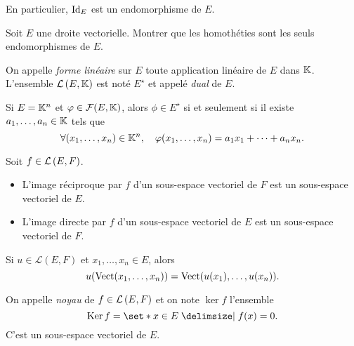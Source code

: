 \documentclass{magnoliaold}
\begin{document}
\begin{remarqueUnique}
\remarque En particulier, $\operatorname{Id}_E$ est un endomorphisme de $E$.
\end{remarqueUnique}

\begin{exoUnique}
\exo Soit $E$ une droite vectorielle. Montrer que les homothéties sont les seuls
  endomorphismes de $E$.
\end{exoUnique}

\begin{definition}[utile=1]
On appelle \emph{forme linéaire} sur $E$ toute application linéaire de $E$ dans $\mathbb{K}$.
L'ensemble $\mathcal{L}\left(E,\mathbb{K}\right)$ est noté $E^\star$ et appelé \emph{dual} de $E$.
\end{definition}

\begin{remarqueUnique}
\remarque Si $E=\mathbb{K}^n$ et $\varphi\in\mathcal{F}(E,\mathbb{K})$, alors $\phi\in E^\star$
  si et seulement si il existe $a_1,\ldots,a_n\in\mathbb{K}$ tels que
  \[\forall (x_1,\ldots,x_n)\in\mathbb{K}^n,\quad \varphi(x_1,\ldots,x_n)=a_1x_1+\cdots+a_nx_n.\]
\end{remarqueUnique}

\begin{proposition}[utile=-3]
Soit $f\in\mathcal{L}\left(E,F\right)$.
\begin{itemize}
\item L'image réciproque par $f$ d'un sous-espace vectoriel de $F$ est un
  sous-espace vectoriel de $E$.
\item L'image directe par $f$ d'un sous-espace vectoriel de $E$ est un
  sous-espace vectoriel de $F$.
\end{itemize}
\end{proposition}

\begin{remarqueUnique}
\remarque Si $u\in\mathcal{L}(E, F)$ et $x_1,\ldots,x_n\in E$, alors
  \[u(\operatorname{Vect}(x_1,\ldots,x_n))=\operatorname{Vect}(u(x_1),\ldots,u(x_n)).\]
\end{remarqueUnique}

\begin{definition}[utile=-3]
On appelle \emph{noyau} de $f\in\mathcal{L}\left(E,F\right)$ et on note $\ker f$ l'ensemble
\[\ker f=\enstq{x\in E}{f(x)=0}.\]  
C'est un sous-espace vectoriel de $E$.
\end{definition}

\end{document}

